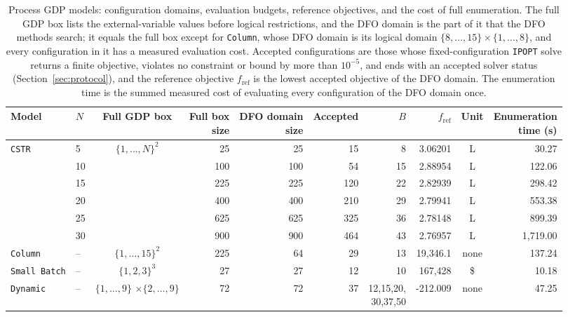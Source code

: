 \documentclass{article}
\begin{document}
\begin{table}[htbp]
\centering
\caption{Process GDP models: configuration domains, evaluation budgets, reference objectives, and the cost of full enumeration.
The full GDP box lists the external-variable values before logical restrictions, and the DFO domain is the part of it that the DFO methods search; it equals the full box except for \texttt{Column}, whose DFO domain is its logical domain \(\{8,\ldots,15\}\times\{1,\ldots,8\}\), and every configuration in it has a measured evaluation cost.
Accepted configurations are those whose fixed-configuration \texttt{IPOPT} solve returns a finite objective, violates no constraint or bound by more than \(10^{-5}\), and ends with an accepted solver status (Section~\ref{sec:protocol}), and the reference objective \(f_{\mathrm{ref}}\) is the lowest accepted objective of the DFO domain.
The enumeration time is the summed measured cost of evaluating every configuration of the DFO domain once.}
\label{tab:process-cases}
\footnotesize
\setlength{\tabcolsep}{3.5pt}
\begin{threeparttable}
\begin{tabular}{@{}llcrrrrrcr@{}}
\toprule
Model & \(N\) & Full GDP box & \makecell{Full box\\size} & \makecell{DFO domain\\size} & Accepted & \(B\) & \(f_{\mathrm{ref}}\) & Unit & \makecell{Enumeration\\time (s)} \\
\midrule
\multirow{6}{*}{\texttt{CSTR}} & 5 & \multirow{6}{*}{\(\{1,\ldots,N\}^{2}\)} & 25 & 25 & 15 & 8 & 3.06201 & L & 30.27 \\
 & 10 &  & 100 & 100 & 54 & 15 & 2.88954 & L & 122.06 \\
 & 15 &  & 225 & 225 & 120 & 22 & 2.82939 & L & 298.42 \\
 & 20 &  & 400 & 400 & 210 & 29 & 2.79941 & L & 553.38 \\
 & 25 &  & 625 & 625 & 325 & 36 & 2.78148 & L & 899.39 \\
 & 30 &  & 900 & 900 & 464 & 43 & 2.76957 & L & 1{,}719.00 \\
\midrule
\texttt{Column} & -- & \(\{1,\ldots,15\}^{2}\) & 225 & 64 & 29 & 13 & 19{,}346.1 & none & 137.24 \\
\midrule
\texttt{Small Batch} & -- & \(\{1,2,3\}^{3}\) & 27 & 27 & 12 & 10 & 167{,}428 & \$ & 10.18 \\
\midrule
\texttt{Dynamic} & -- & \makecell{\(\{1,\ldots,9\}\)\\\(\times\{2,\ldots,9\}\)} & 72 & 72 & 37 & \makecell{12,15,20,\\30,37,50} & -212.009 & none & 47.25 \\

\end{tabular}
\end{threeparttable}
\end{table}
\end{document}
